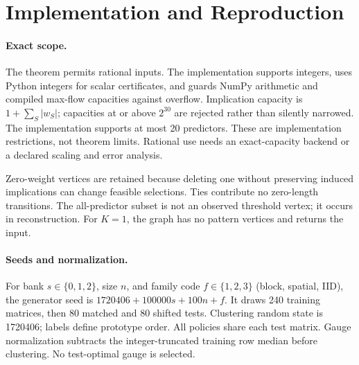 \documentclass[10pt,letterpaper]{article}
\begin{document}
\section{Implementation and Reproduction}
\paragraph{Exact scope.}
The theorem permits rational inputs. The implementation supports integers, uses Python integers for scalar certificates, and guards NumPy arithmetic and compiled max-flow capacities against overflow. Implication capacity is $1+\sum_S|w_S|$; capacities at or above $2^{30}$ are rejected rather than silently narrowed. The implementation supports at most 20 predictors. These are implementation restrictions, not theorem limits. Rational use needs an exact-capacity backend or a declared scaling and error analysis.

Zero-weight vertices are retained because deleting one without preserving induced implications can change feasible selections. Ties contribute no zero-length transitions. The all-predictor subset is not an observed threshold vertex; it occurs in reconstruction. For $K=1$, the graph has no pattern vertices and returns the input.

\paragraph{Seeds and normalization.}
For bank $s\in\{0,1,2\}$, size $n$, and family code $f\in\{1,2,3\}$ (block, spatial, IID), the generator seed is $1720406+100000s+100n+f$. It draws 240 training matrices, then 80 matched and 80 shifted tests. Clustering random state is 1720406; labels define prototype order. All policies share each test matrix. Gauge normalization subtracts the integer-truncated training row median before clustering. No test-optimal gauge is selected.
\end{document}
